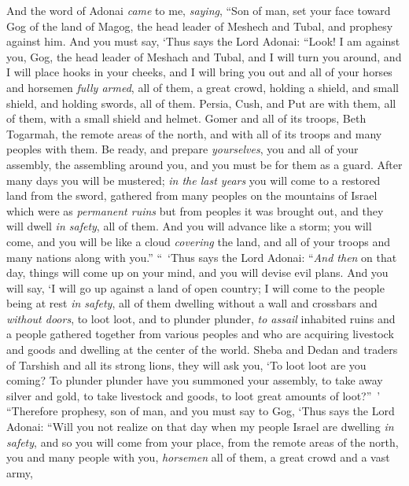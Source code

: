 \begin{biblechapter} %
 And the word of Adonai \textit{came} to me, \textit{saying},
\verse “Son of man, set your face toward Gog of the land of Magog, the head leader of Meshech and Tubal, and prophesy against him.
\verse And you must say, ‘Thus says the Lord Adonai: “Look! I am against you, Gog, the head leader of Meshach and Tubal,
\verse and I will turn you around, and I will place hooks in your cheeks, and I will bring you out and all of your horses and horsemen \textit{fully armed}, all of them, a great crowd, holding a shield, and small shield, and holding swords, all of them.
\verse Persia, Cush, and Put are with them, all of them, with a small shield and helmet.
\verse Gomer and all of its troops, Beth Togarmah, the remote areas of the north, and with all of its troops and many peoples with them.
\verse Be ready, and prepare \textit{yourselves}, you and all of your assembly, the assembling around you, and you must be for them as a guard.
\verse After many days you will be mustered; \textit{in the last years} you will come to a restored land from the sword, gathered from many peoples on the mountains of Israel which were as \textit{permanent ruins} but from peoples it was brought out, and they will dwell \textit{in safety}, all of them.
\verse And you will advance like a storm; you will come, and you will be like a cloud \textit{covering} the land, and all of your troops and many nations along with you.”
\verse “ ‘Thus says the Lord Adonai: “\textit{And then} on that day, things will come up on your mind, and you will devise evil plans.
\verse And you will say, ‘I will go up against a land of open country; I will come to the people being at rest \textit{in safety}, all of them dwelling without a wall and crossbars and \textit{without doors},
\verse to loot loot, and to plunder plunder, \textit{to assail} inhabited ruins and a people gathered together from various peoples and who are acquiring livestock and goods and dwelling at the center of the world.
\verse Sheba and Dedan and traders of Tarshish and all its strong lions, they will ask you, ‘To loot loot are you coming? To plunder plunder have you summoned your assembly, to take away silver and gold, to take livestock and goods, to loot great amounts of loot?” ’
\verse “Therefore prophesy, son of man, and you must say to Gog, ‘Thus says the Lord Adonai: “Will you not realize on that day when my people Israel are dwelling \textit{in safety},
\verse and so you will come from your place, from the remote areas of the north, you and many people with you, \textit{horsemen} all of them, a great crowd and a vast army,

\end{biblechapter}
